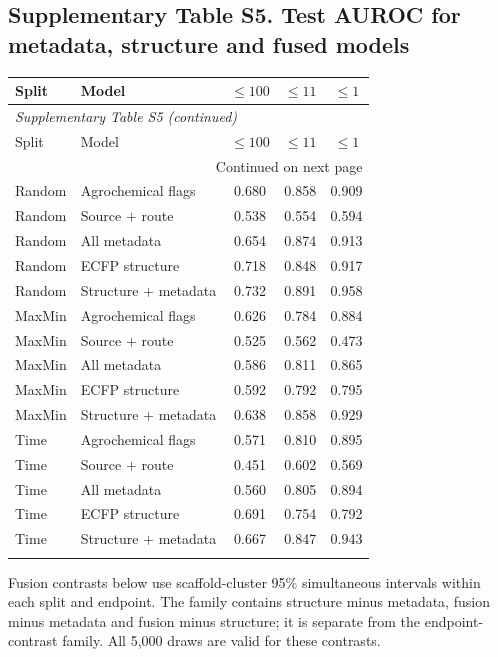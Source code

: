 \subsection*{Supplementary Table S5. Test AUROC for metadata, structure and fused models}
\begin{longtable}{llccc}

\toprule Split & Model & $\leq100$ & $\leq11$ & $\leq1$ \\ \midrule\endfirsthead
\multicolumn{5}{l}{\textit{Supplementary Table S5 (continued)}} \\
\toprule Split & Model & $\leq100$ & $\leq11$ & $\leq1$ \\ \midrule\endhead
\midrule\multicolumn{5}{r}{Continued on next page}\\\endfoot
\bottomrule\endlastfoot
Random & Agrochemical flags & 0.680 & 0.858 & 0.909 \\
Random & Source $+$ route & 0.538 & 0.554 & 0.594 \\
Random & All metadata & 0.654 & 0.874 & 0.913 \\
Random & ECFP structure & 0.718 & 0.848 & 0.917 \\
Random & Structure $+$ metadata & 0.732 & 0.891 & 0.958 \\
\addlinespace
MaxMin & Agrochemical flags & 0.626 & 0.784 & 0.884 \\
MaxMin & Source $+$ route & 0.525 & 0.562 & 0.473 \\
MaxMin & All metadata & 0.586 & 0.811 & 0.865 \\
MaxMin & ECFP structure & 0.592 & 0.792 & 0.795 \\
MaxMin & Structure $+$ metadata & 0.638 & 0.858 & 0.929 \\
\addlinespace
Time & Agrochemical flags & 0.571 & 0.810 & 0.895 \\
Time & Source $+$ route & 0.451 & 0.602 & 0.569 \\
Time & All metadata & 0.560 & 0.805 & 0.894 \\
Time & ECFP structure & 0.691 & 0.754 & 0.792 \\
Time & Structure $+$ metadata & 0.667 & 0.847 & 0.943 \\
\addlinespace
\end{longtable}
Fusion contrasts below use scaffold-cluster 95\% simultaneous intervals within each split and endpoint. The family contains structure minus metadata, fusion minus metadata and fusion minus structure; it is separate from the endpoint-contrast family. All 5,000 draws are valid for these contrasts.
